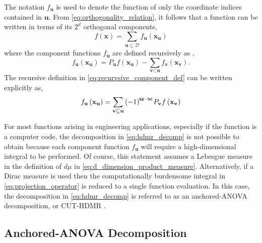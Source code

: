 The notation $f_\textbf{u}$ is used to denote the function of only the coordinate indices contained in $\textbf{u}$. From \ref{eq:orthogonality_relation}, it follows that a function can be written in terms of its $2^d$ orthogonal components,
\begin{equation} \label{eq:hdmr_decomp}
    f\left(\textbf{x}\right) = 
     \sum_{\textbf{u}\subseteq\mathcal{D}}
      f_\textbf{u}\left(\textbf{x}_\textbf{u}\right)
\end{equation}
where the component functions $f_\textbf{u}$ are defined recursively as \cite{Holtz},
\begin{equation} \label{eq:recurvsive_component_def}
    f_\textbf{u}\left(\textbf{x}_\textbf{u}\right) = 
     P_\textbf{u}f\left(\textbf{x}_\textbf{u}\right) -
      \sum_{\textbf{v}\subset\textbf{u}}
       f_\textbf{v}\left(\textbf{x}_\textbf{v}\right).  
\end{equation}
The recursive definition in \ref{eq:recurvsive_component_def} can be written explicitly as,
\begin{equation} \label{eq:explicit_component_def}
    f_\textbf{u}\left(\textbf{x}_\textbf{u}\right) =
     \sum_{\textbf{v}\subseteq\textbf{u}}
      \left(-1\right)^{\vline\textbf{u}\vline-\vline\textbf{v}\vline}
       P_\textbf{v}f\left(\textbf{x}_\textbf{v}\right)    
\end{equation}

For most functions arising in engineering applications, especially if the function is a computer code, the decomposition in \ref{eq:hdmr_decomp} is not possible to obtain because each component function $f_\textbf{u}$ will require a high-dimensional integral to be performed. Of course, this statement assumes a Lebesgue measure in the definition of $d\mu$ in \ref{eq:d_dimension_product_measure}. Alternatively, if a Dirac measure is used then the computationally burdensome integral in \ref{eq:projection_operator} is reduced to a single function evaluation. In this case, the decomposition in \ref{eq:hdmr_decomp} is referred to as an anchored-\ac{ANOVA} decomposition, or CUT-\ac{HDMR} \cite{AHSGC_HighDimensions}.

\subsection{Anchored-ANOVA Decomposition} \label{subsec:anchored_anova}

